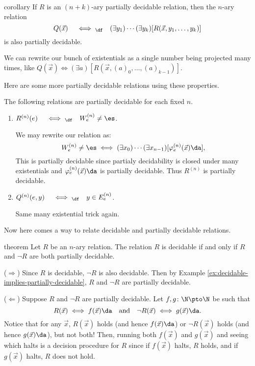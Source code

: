 \documentclass[class=article, crop=false]{standalone}
\begin{document}
\begin{result}{corollary}
  If $R$ is an $(n+k)$-ary partially decidable relation, then the $n$-ary relation
    \[
      Q(\vec x) \quad \iff_\df \quad (\exists y_1)\cdots(\exists y_k)[R(\vec x,y_1, \ldots, y_k)]
    \]
  is also partially decidable.
\end{result}
\begin{rem}
  We can rewrite our bunch of existentials as a single number being projected many times, like $Q(\vec x) \iff (\exists a)[R(\vec x, (a)_0, \ldots, (a)_{k-1})]$.
\end{rem}

Here are some more partially decidable relations using these properties.
\begin{ex}
  The following relations are partially decidable for each fixed $n$.
  \begin{enumerate}[(1)]
    \item $R^{(n)}(e) \quad \iff_\df \quad W_e^{(n)} \neq \es$.
      \begin{pf}
        We may rewrite our relation as:
          \[
            W_e^{(n)}\neq \es \iff (\exists x_0) \cdots (\exists x_{n-1})[\varphi_e^{(n)}(\vec x) \da],
          \]
        This is partially decidable since partialy decidability is closed under many existentials and $\varphi_e^{(n)}(\vec x) \da$ is partially decidable. Thus $R^{(n)}$ is partially decidable.
      \end{pf}

    \item $Q^{(n)}(e,y) \quad \iff_\df \quad y \in E_e^{(n)}$.
    \begin{pf}
       Same many existential trick again.
    \end{pf}
  \end{enumerate}
\end{ex}

Now here comes a way to relate decidable and partially decidable relations.
\begin{result}{theorem}
  Let $R$ be an $n$-ary relation. The relation $R$ is decidable if and only if $R$ and $\lnot R$ are both partially decidable.
\end{result}
\begin{pf}
  ($\Rightarrow$) Since $R$ is decidable, $\lnot R$ is also decidable. Then by Example \ref{ex:decidable-implies-partially-decidable}, $R$ and $\lnot R$ are partially decidable.

  ($\Leftarrow$) Suppose $R$ and $\lnot R$ are partially decidable. Let $f,g \colon \N \pto \N$ be such that
    \[
      R(\vec x) \iff f(\vec x)\da \quad \text{and} \quad \lnot R(\vec x) \iff g(\vec x) \da.
    \]
  Notice that for any $\vec x$, $R(\vec x)$ holds (and hence $f(\vec x) \da$) or $\lnot R(\vec x)$ holds (and hence $g(\vec x)\da$), but not both! Then, running both $f(\vec x)$ and $g(\vec x)$ and seeing which halts is a decision procedure for $R$ since if $f(\vec x)$ halts, $R$ holds, and if $g(\vec x)$ halts, $R$ does not hold.
\end{pf}
\end{document}
